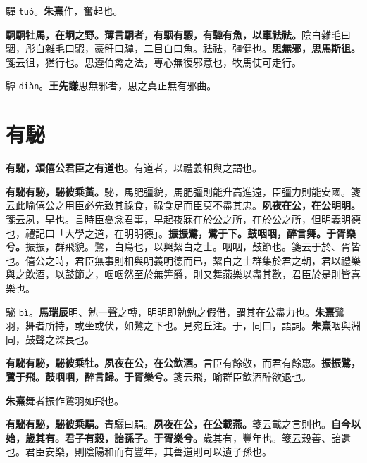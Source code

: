 \begin{quoting}驒 \texttt{tuó}。\textbf{朱熹}作，奮起也。\end{quoting}

\textbf{駉駉牡馬，在坰之野。薄言駉者，有駰有騢，有驔有魚，以車祛祛。}{\footnotesize 陰白雜毛曰駰，彤白雜毛曰騢，豪骭曰驔，二目白曰魚。祛祛，彊健也。}\textbf{思無邪，思馬斯徂。}{\footnotesize 箋云徂，猶行也。思遵伯禽之法，專心無復邪意也，牧馬使可走行。}

\begin{quoting}驔 \texttt{diàn}。\textbf{王先謙}思無邪者，思之真正無有邪曲。\end{quoting}

\section{有駜}


\textbf{有駜，頌僖公君臣之有道也。}{\footnotesize 有道者，以禮義相與之謂也。}

\textbf{有駜有駜，駜彼乘黃。}{\footnotesize 駜，馬肥彊貌，馬肥彊則能升高進遠，臣彊力則能安國。箋云此喻僖公之用臣必先致其祿食，祿食足而臣莫不盡其忠。}\textbf{夙夜在公，在公明明。}{\footnotesize 箋云夙，早也。言時臣憂念君事，早起夜寐在於公之所，在於公之所，但明義明德也，禮記曰「大學之道，在明明德」。}\textbf{振振鷺，鷺于下。鼓咽咽，醉言舞。于胥樂兮。}{\footnotesize 振振，群飛貌。鷺，白鳥也，以興絜白之士。咽咽，鼓節也。箋云于於、胥皆也。僖公之時，君臣無事則相與明義明德而已，絜白之士群集於君之朝，君以禮樂與之飲酒，以鼓節之，咽咽然至於無筭爵，則又舞燕樂以盡其歡，君臣於是則皆喜樂也。}

\begin{quoting}駜 \texttt{bì}。\textbf{馬瑞辰}明、勉一聲之轉，明明即勉勉之假借，謂其在公盡力也。\textbf{朱熹}鷺羽，舞者所持，或坐或伏，如鷺之下也。見宛丘注。于，同曰，語詞。\textbf{朱熹}咽與淵同，鼓聲之深長也。\end{quoting}

\textbf{有駜有駜，駜彼乘牡。夙夜在公，在公飲酒。}{\footnotesize 言臣有餘敬，而君有餘惠。}\textbf{振振鷺，鷺于飛。鼓咽咽，醉言歸。于胥樂兮。}{\footnotesize 箋云飛，喻群臣飲酒醉欲退也。}

\begin{quoting}\textbf{朱熹}舞者振作鷺羽如飛也。\end{quoting}

\textbf{有駜有駜，駜彼乘駽。}{\footnotesize 青驪曰駽。}\textbf{夙夜在公，在公載燕。}{\footnotesize 箋云載之言則也。}\textbf{自今以始，歲其有。君子有穀，詒孫子。于胥樂兮。}{\footnotesize 歲其有，豐年也。箋云穀善、詒遺也。君臣安樂，則陰陽和而有豐年，其善道則可以遺子孫也。}

